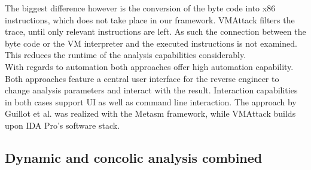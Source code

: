 \documentclass[10pt,twoside,a4paper,bibliography=totoc]{scrbook}
\begin{document}
The biggest difference however is the conversion of the byte code into x86 instructions, which does not take place in our framework. 
VMAttack filters the trace, until only relevant instructions are left. As such the connection between the byte code or the VM interpreter and the executed instructions is not examined. This reduces the runtime of the analysis capabilities considerably.\\
With regards to automation both approaches offer high automation capability. Both approaches feature a central user interface for the reverse engineer to change analysis parameters and interact with the result. Interaction capabilities in both cases support UI as well as command line interaction. The approach by Guillot et al. was realized with the Metasm framework, while VMAttack builds upon IDA Pro's software stack. 


\subsection{Dynamic and concolic analysis combined}
\end{document}
